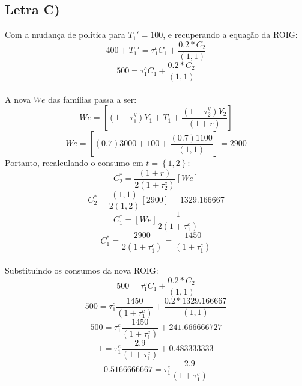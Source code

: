 \documentclass{article}
\begin{document}
\subsection*{Letra C)}
Com a mudança de política para $T_1'=100$, e recuperando a equação da ROIG:
\begin{equation}\label{eq:14cnot1}
    400 +T_1' = \tau_1^c C_1 + \frac{0.2*C_2}{(1,1)}
\end{equation}
\begin{equation}
    500 = \tau_1^c C_1 + \frac{0.2*C_2}{(1,1)}
\end{equation}
\\
A nova $We$ das famílias passa a ser:
\begin{equation}
    We=\left[(1-\tau_1^y)Y_1 + T_1 + \frac{(1-\tau_2^y)Y_2}{(1+r)}\right]
\end{equation}
\begin{equation}
    We=\left[(0.7)3000 + 100 + \frac{(0.7)1100}{(1,1)}\right] = 2900
\end{equation}
Portanto, recalculando o consumo em $t=\left\{1,2\right\}$:
\begin{equation}
    C_2^* = \frac{(1+r)}{2(1+\tau_2^c)}\left[We\right]
\end{equation}
\begin{equation}
    C_2^* = \frac{(1,1)}{2(1,2)}\left[2900\right]=1329.166667
\end{equation}
\begin{equation}
    C_1^* = \left[We\right]\frac{1}{2(1+\tau_1^c)}
\end{equation}
\begin{equation}
    C_1^* = \frac{2900}{2(1+\tau_1^c)}=\frac{1450}{(1+\tau_1^c)}
\end{equation}
\\
Substituindo os consumos da nova ROIG:
\begin{equation}
    500 = \tau_1^c C_1 + \frac{0.2*C_2}{(1,1)}
\end{equation}
\begin{equation}
    500 = \tau_1^c \frac{1450}{(1+\tau_1^c)} + \frac{0.2*1329.166667}{(1,1)}
\end{equation}
\begin{equation}
    500 = \tau_1^c \frac{1450}{(1+\tau_1^c)} + 241.666666727
\end{equation}
\begin{equation}
    1 = \tau_1^c \frac{2.9}{(1+\tau_1^c)} + 0.483333333
\end{equation}
\begin{equation}
    0.5166666667 = \tau_1^c \frac{2.9}{(1+\tau_1^c)} 
\end{equation}
\end{document}
